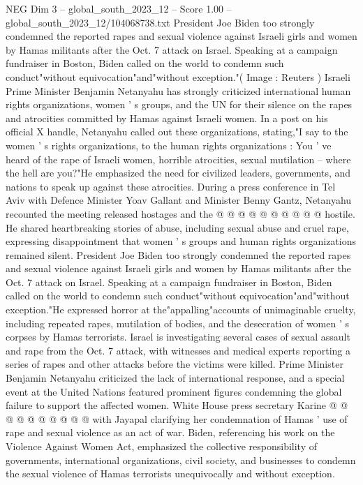 \begin{textsample}{NEG Dim 3 – global\_south\_2023\_12 – Score 1.00 – global\_south\_2023\_12/104068738.txt}  \label{ex:f3_neg_006}
President Joe Biden too strongly condemned the reported rapes and sexual violence against Israeli girls and women by Hamas militants after the Oct. 7 attack on Israel.
Speaking at a campaign fundraiser in Boston, Biden called on the world to condemn such conduct"without equivocation"and"without exception."( Image : Reuters ) Israeli Prime Minister Benjamin Netanyahu has strongly criticized international human rights organizations, women ' s groups, and the UN for their silence on the rapes and atrocities committed by Hamas against Israeli women.
In a post on his official X handle, Netanyahu called out these organizations, stating,"I say to the women ' s rights organizations, to the human rights organizations : You ' ve heard of the rape of Israeli women, horrible atrocities, sexual mutilation -- where the hell are you?"He emphasized the need for civilized leaders, governments, and nations to speak up against these atrocities.
During a press conference in Tel Aviv with Defence Minister Yoav Gallant and Minister Benny Gantz, Netanyahu recounted the meeting released hostages and the @ @ @ @ @ @ @ @ @ @ hostile.
He shared heartbreaking stories of abuse, including sexual abuse and cruel rape, expressing disappointment that women ' s groups and human rights organizations remained silent.
President Joe Biden too strongly condemned the reported rapes and sexual violence against Israeli girls and women by Hamas militants after the Oct. 7 attack on Israel.
Speaking at a campaign fundraiser in Boston, Biden called on the world to condemn such conduct"without equivocation"and"without exception."He expressed horror at the"appalling"accounts of unimaginable cruelty, including repeated rapes, mutilation of bodies, and the desecration of women ' s corpses by Hamas terrorists.
Israel is investigating several cases of sexual assault and rape from the Oct. 7 attack, with witnesses and medical experts reporting a series of rapes and other attacks before the victims were killed.
Prime Minister Benjamin Netanyahu criticized the lack of international response, and a special event at the United Nations featured prominent figures condemning the global failure to support the affected women.
White House press secretary Karine @ @ @ @ @ @ @ @ @ @ with Jayapal clarifying her condemnation of Hamas ' use of rape and sexual violence as an act of war.
Biden, referencing his work on the Violence Against Women Act, emphasized the collective responsibility of governments, international organizations, civil society, and businesses to condemn the sexual violence of Hamas terrorists unequivocally and without exception.

\end{textsample}

